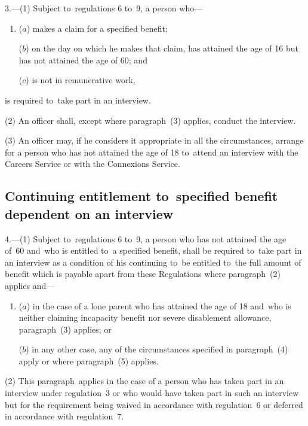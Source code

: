 \documentclass[12pt,a4paper]{article}
\begin{document}
3.---(1)  Subject to~regulations 6 to~9, a person who—
\begin{enumerate}\item[]
($a$) makes a claim for a specified benefit;

($b$) on the day on which he makes that claim, has attained the age of 16 but has not attained the age of 60; and

($c$) is not in remunerative work,
\end{enumerate}
is required to~take part in an interview.

(2) An officer shall, except where paragraph~(3) applies, conduct the interview.

(3) An officer may, if he considers it appropriate in all the circumstances, arrange for a person who has not attained the age of 18 to~attend an interview with the Careers Service or with the Connexions Service.

\subsection[4. Continuing entitlement to~specified benefit dependent on an interview]{Continuing entitlement to~specified benefit dependent on an interview}

\enlargethispage{-\baselineskip}

4.---(1)  Subject to~regulations 6 to~9, a person who has not attained the age of~60 and~who is entitled to~a specified benefit, shall be required to~take part in an interview as a condition of his continuing to~be entitled to~the full amount of benefit which is payable apart from these Regulations where paragraph~(2) applies and—
\begin{enumerate}\item[]
($a$) in the case of a lone parent who has attained the age of 18 and~who is neither claiming incapacity benefit nor severe disablement allowance, paragraph~(3) applies; or

($b$) in any other case, any of the circumstances specified in paragraph~(4) apply or where paragraph~(5) applies.
\end{enumerate}

(2) This paragraph~applies in the case of a person who has taken part in an interview under regulation~3 or who would have taken part in such an interview but for the requirement being waived in accordance with regulation~6 or deferred in accordance with regulation~7.
\end{document}

